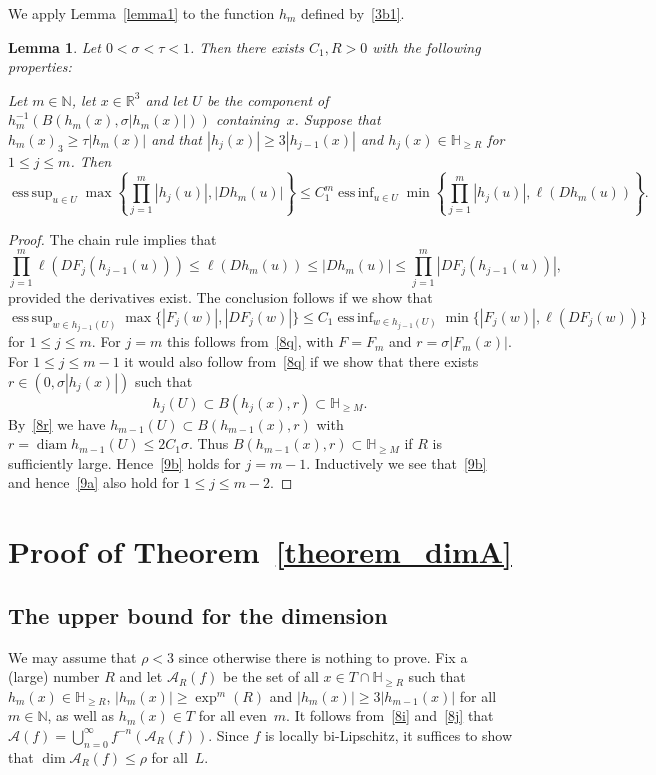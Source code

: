 \documentclass[12pt,a4paper]{amsart}
\theoremstyle{plain}
\newtheorem{lemma}[theorem]{Lemma}
\theoremstyle{definition}
\theoremstyle{remark}
\newcommand{\diam}{\operatorname{diam}}
\DeclareMathOperator*{\esssup}{ess\,sup}
\DeclareMathOperator*{\essinf}{ess\,inf}
\def\R{\mathbb R}
\def\N{\mathbb N}
\def\H{\mathbb H}
\def\cA{\mathcal A}
\numberwithin{equation}{section}
\begin{document}
We apply Lemma~\ref{lemma1} to the function $h_m$ defined by~\eqref{3b1}.
\begin{lemma} \label{lemma1a}
Let $0<\sigma<\tau<1$.
Then there exists $C_1,R>0$ with the following properties:

Let $m\in\N$, let $x\in\R^3$ and
let $U$ be the component of $h_m^{-1}(B(h_m(x),\sigma|h_m(x)|))$ containing~$x$.
Suppose that $h_m(x)_3\geq \tau|h_m(x)|$
and that $|h_j(x)|\geq 3|h_{j-1}(x)|$ and $h_j(x)\in\H_{\geq R}$ for $1\leq j\leq m$.
Then
\begin{equation}\label{8y}
\esssup_{u\in U} \max \left\{\prod_{j=1}^m |h_j(u)|,|Dh_m(u)|\right\}
\leq C_1^m \essinf_{u\in U} \min \left\{\prod_{j=1}^m |h_j(u)|,\ell(Dh_m(u))\right\}.
\end{equation}
\end{lemma} 
\begin{proof} 
The chain rule implies that 
\begin{equation}\label{8z}
\prod_{j=1}^m \ell(DF_j(h_{j-1}(u)))
\leq 
\ell(Dh_m(u))
\leq |Dh_m(u)|\leq \prod_{j=1}^m |DF_j(h_{j-1}(u))| ,
\end{equation}
provided the derivatives exist.
The conclusion follows if we show that 
\begin{equation}\label{9a}
\esssup_{w\in h_{j-1}(U)} \max \{|F_j(w)|,|DF_j(w)|\}
\leq C_1 \essinf_{w\in h_{j-1}(U)} \min \{|F_j(w)|,\ell(DF_j(w))\}
\end{equation}
for $1\leq j\leq m$.
For $j=m$ this follows from~\eqref{8q}, with $F=F_m$ and $r=\sigma|F_m(x)|$.
For $1\leq j\leq m-1$ it would also follow from~\eqref{8q} if
we show that there exists $r\in (0,\sigma |h_j(x)|)$ such that
\begin{equation}\label{9b}
h_j(U)\subset B(h_j(x),r)\subset \H_{\geq M}.
\end{equation}
By~\eqref{8r} we have $h_{m-1}(U)\subset B(h_{m-1}(x),r)$ with $r=\diam h_{m-1}(U)\leq 2C_1\sigma$.
Thus $B(h_{m-1}(x),r)\subset\H_{\geq M}$
if $R$ is sufficiently large. Hence~\eqref{9b} holds for $j=m-1$.
Inductively we see 
that~\eqref{9b} and hence~\eqref{9a} also hold for $1\leq j\leq m-2$.
\end{proof} 

\section{Proof of Theorem~\ref{theorem_dimA}} \label{lower_bound}
\subsection{The upper bound for the dimension} \label{upper_bound}
We may assume that $\rho<3$ since otherwise there is nothing to prove.
Fix a (large) number $R$ and let $\cA_R(f)$ be the set of all $x\in T\cap\H_{\geq R}$
such that $h_m(x)\in\H_{\geq R}$,
$|h_{m}(x)| \geq \exp^{m}(R)$
and $|h_m(x)|\geq 3 |h_{m-1}(x)|$
for all $m\in\N$, 
as well as $h_m(x)\in T$ for all even~$m$.
It follows from~\eqref{8i} and~\eqref{8j} that 
$\cA(f)=\bigcup_{n=0}^\infty f^{-n}(\cA_R(f))$.
Since $f$ is locally bi-Lipschitz, it suffices to show that
$\dim \cA_R(f)\leq \rho$ for all~$L$.
\end{document}
